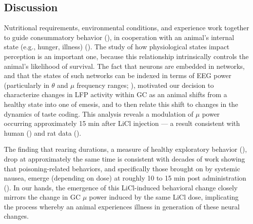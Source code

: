 \begin{refsection}
\section{Discussion}
Nutritional requirements, environmental conditions, and experience work together to guide consummatory behavior (\cite{parker1982a,provenza1995a,flores2018a}), in cooperation with an animal’s internal state (e.g., hunger, illness) (\cite{livneh2020a}). The study of how physiological states impact perception is an important one, because this relationship intrinsically controls the animal’s likelihood of survival. The fact that neurons are embedded in networks, and that the states of such networks can be indexed in terms of EEG power (particularly in \(\theta\) and \(\mu\) frequency ranges; \cite{fontanini2005a,fontanini2006a,fontanini2008a}), motivated our decision to characterize changes in LFP activity within GC as an animal shifts from a healthy state into one of emesis, and to then relate this shift to changes in the dynamics of taste coding. This analysis reveals a modulation of \(\mu\) power occurring approximately 15 min after LiCl injection --- a result consistent with human (\cite{chen2010a}) and rat data (\cite{aguilar-rivera2020a}).

The finding that rearing durations, a measure of healthy exploratory behavior (\cite{parker1982a,tomasiewicz2006a,l2019a,aguilar-rivera2020a,alves2005a,rosana2012a}), drop at approximately the same time is consistent with decades of work showing that poisoning-related behaviors, and specifically those brought on by systemic nausea, emerge (depending on dose) at roughly 10 to 15 min post administration (\cite{parker1982a,nachman1963a,nachman1973a,aguilar-rivera2020a}). In our hands, the emergence of this LiCl-induced behavioral change closely mirrors the change in GC \(\mu\) power induced by the same LiCl dose, implicating the process whereby an animal experiences illness in generation of these neural changes.


\end{refsection}
